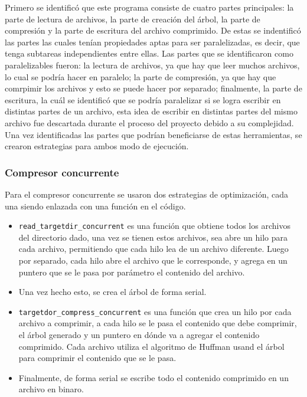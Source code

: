 \documentclass{report}
\begin{document}
Primero se identificó que este programa consiste de cuatro partes principales: la parte de lectura de archivos, la parte de creación del árbol, la parte de compresión y la parte de escritura del archivo comprimido.
De estas se indentificó las partes las cuales tenían propiedades aptas para ser paralelizadas, es decir, que tenga subtareas independientes entre ellas.
Las partes que se identificaron como paralelizables fueron: la lectura de archivos, ya que hay que leer muchos archivos, lo cual se podría hacer en paralelo; la parte de compresión, ya que hay que comrpimir los archivos y esto se puede hacer por separado; finalmente, la parte de escritura, la cuál se identificó que se podría paralelizar si se logra escribir en distintas partes de un archivo, esta idea de escribir en distintas partes del mismo archivo fue descartada durante el proceso del proyecto debido a su complejidad.
Una vez identificadas las partes que podrían beneficiarse de estas herramientas, se crearon estrategias para ambos modo de ejecución.

\subsubsection {Compresor concurrente}

Para el compresor concurrente se usaron dos estrategias de optimización, cada una siendo enlazada con una función en el código.
\begin{itemize}
    \item \texttt{read\_targetdir\_concurrent} es una función que obtiene todos los archivos del directorio dado, una vez se tienen estos archivos, sea abre un hilo para cada archivo, permitiendo que cada hilo lea de un archivo diferente. Luego por separado, cada hilo abre el archivo que le corresponde, y agrega en un puntero que se le pasa por parámetro el contenido del archivo. 
    \item Una vez hecho esto, se crea el árbol de forma serial.
    \item \texttt{targetdor\_compress\_concurrent} es  una función que crea un hilo por cada archivo a comprimir, a cada hilo se le pasa el contenido que debe comprimir, el árbol generado y un puntero en dónde va a agregar el contenido comprimido. Cada archivo utiliza el algoritmo de Huffman usand el árbol para comprimir el contenido que se le pasa.
    \item Finalmente, de forma serial se escribe todo el contenido comprimido en un archivo en binaro.
\end{itemize}
\end{document}
